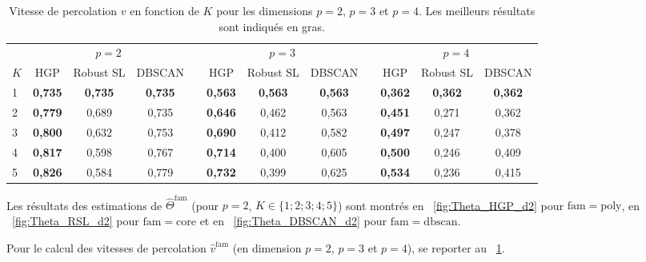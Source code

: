 \begin{table}[htbp]
    \centering
    \footnotesize
    \caption{Vitesse de percolation $v$ en fonction de $K$ pour les dimensions $p=2$, $p=3$ et $p=4$. Les meilleurs résultats sont indiqués en gras.}
    \label{tab:percolation_horizontal}
    \begin{tabular}{@{} l ccc c ccc c ccc @{}}
        \toprule
        & \multicolumn{3}{c}{$p=2$} & \phantom{a} & \multicolumn{3}{c}{$p=3$} & \phantom{a} & \multicolumn{3}{c}{$p=4$} \\
        \cmidrule{2-4} \cmidrule{6-8} \cmidrule{10-12}
        $K$ & HGP & Robust SL & DBSCAN && HGP & Robust SL & DBSCAN && HGP & Robust SL & DBSCAN \\
        \midrule
        1 & \textbf{0,735} & \textbf{0,735} & \textbf{0,735} && \textbf{0,563} & \textbf{0,563} & \textbf{0,563} && \textbf{0,362} & \textbf{0,362} & \textbf{0,362} \\
        2 & \textbf{0,779} & 0,689 & 0,735 && \textbf{0,646} & 0,462 & 0,563 && \textbf{0,451} & 0,271 & 0,362 \\
        3 & \textbf{0,800} & 0,632 & 0,753 && \textbf{0,690} & 0,412 & 0,582 && \textbf{0,497} & 0,247 & 0,378 \\
        4 & \textbf{0,817} & 0,598 & 0,767 && \textbf{0,714} & 0,400 & 0,605 && \textbf{0,500} & 0,246 & 0,409 \\
        5 & \textbf{0,826} & 0,584 & 0,779 && \textbf{0,732} & 0,399 & 0,625 && \textbf{0,534} & 0,236 & 0,415 \\
        \bottomrule
    \end{tabular}
\end{table}

Les résultats des estimations de $\widehat \Theta^{\mathrm{fam}}$ (pour $p=2$, $K\in \bigl\{ 1 ; 2; 3 ; 4 ; 5\bigr\}$) sont montrés en \Fig~\ref{fig:Theta_HGP_d2} pour $\mathrm{fam} = \mathrm{poly}$, en \Fig~\ref{fig:Theta_RSL_d2} pour $\mathrm{fam} = \mathrm{core} $ et en \Fig~\ref{fig:Theta_DBSCAN_d2} pour $\mathrm{fam} = \mathrm{dbscan}$.

Pour le calcul des vitesses de percolation $\widehat v^{\mathrm{fam}}$ (en dimension $p=2$, $p=3$ et $p=4$), se reporter au \Tab~\ref{tab:percolation_horizontal}.


